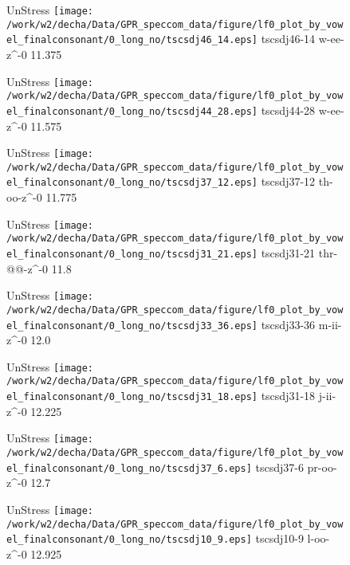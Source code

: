 \documentclass{article}
\begin{document}
\begin{figure}[t]
\begin{minipage}[b]{.24\textwidth}
UnStress
\centering
\texttt{[image: /work/w2/decha/Data/GPR\_speccom\_data/figure/lf0\_plot\_by\_vowel\_finalconsonant/0\_long\_no/tscsdj46\_14.eps]}
tscsdj46-14 w-ee-z\textasciicircum-0 11.375
\end{minipage}
\begin{minipage}[b]{.24\textwidth}
UnStress
\centering
\texttt{[image: /work/w2/decha/Data/GPR\_speccom\_data/figure/lf0\_plot\_by\_vowel\_finalconsonant/0\_long\_no/tscsdj44\_28.eps]}
tscsdj44-28 w-ee-z\textasciicircum-0 11.575
\end{minipage}
\begin{minipage}[b]{.24\textwidth}
UnStress
\centering
\texttt{[image: /work/w2/decha/Data/GPR\_speccom\_data/figure/lf0\_plot\_by\_vowel\_finalconsonant/0\_long\_no/tscsdj37\_12.eps]}
tscsdj37-12 th-oo-z\textasciicircum-0 11.775
\end{minipage}
\begin{minipage}[b]{.24\textwidth}
UnStress
\centering
\texttt{[image: /work/w2/decha/Data/GPR\_speccom\_data/figure/lf0\_plot\_by\_vowel\_finalconsonant/0\_long\_no/tscsdj31\_21.eps]}
tscsdj31-21 thr-@@-z\textasciicircum-0 11.8
\end{minipage}
\end{figure}

\begin{figure}[t]
\begin{minipage}[b]{.24\textwidth}
UnStress
\centering
\texttt{[image: /work/w2/decha/Data/GPR\_speccom\_data/figure/lf0\_plot\_by\_vowel\_finalconsonant/0\_long\_no/tscsdj33\_36.eps]}
tscsdj33-36 m-ii-z\textasciicircum-0 12.0
\end{minipage}
\begin{minipage}[b]{.24\textwidth}
UnStress
\centering
\texttt{[image: /work/w2/decha/Data/GPR\_speccom\_data/figure/lf0\_plot\_by\_vowel\_finalconsonant/0\_long\_no/tscsdj31\_18.eps]}
tscsdj31-18 j-ii-z\textasciicircum-0 12.225
\end{minipage}
\begin{minipage}[b]{.24\textwidth}
UnStress
\centering
\texttt{[image: /work/w2/decha/Data/GPR\_speccom\_data/figure/lf0\_plot\_by\_vowel\_finalconsonant/0\_long\_no/tscsdj37\_6.eps]}
tscsdj37-6 pr-oo-z\textasciicircum-0 12.7
\end{minipage}
\begin{minipage}[b]{.24\textwidth}
UnStress
\centering
\texttt{[image: /work/w2/decha/Data/GPR\_speccom\_data/figure/lf0\_plot\_by\_vowel\_finalconsonant/0\_long\_no/tscsdj10\_9.eps]}
tscsdj10-9 l-oo-z\textasciicircum-0 12.925
\end{minipage}
\end{figure}
\end{document}
